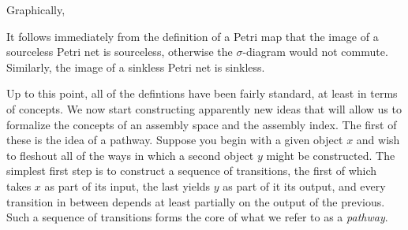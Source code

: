 \documentclass[aps,prd,onecolumn,nofootinbib,letterpaper,preprintnumbers,superscriptaddress,eqsecnum]{revtex4}
\theoremstyle{definition}
\begin{document}
Graphically, 
\begin{center}
\end{center}
It follows immediately from the definition of a Petri map that the image of a sourceless Petri net is sourceless, otherwise the $\sigma$-diagram would not commute.
Similarly, the image of a sinkless Petri net is sinkless.

Up to this point, all of the defintions have been fairly standard, at least in terms of concepts.
We now start constructing apparently new ideas that will allow us to formalize the concepts of an assembly space and the assembly index.
The first of these is the idea of a pathway.
Suppose you begin with a given object $x$ and wish to fleshout all of the ways in which a second object $y$ might be constructed.
The simplest first step is to construct a sequence of transitions, the first of which takes $x$ as part of its input, the last yields $y$ as part of it its output, and every transition in between depends at least partially on the output of the previous.
Such a sequence of transitions forms the core of what we refer to as a \textit{pathway}.
\end{document}
